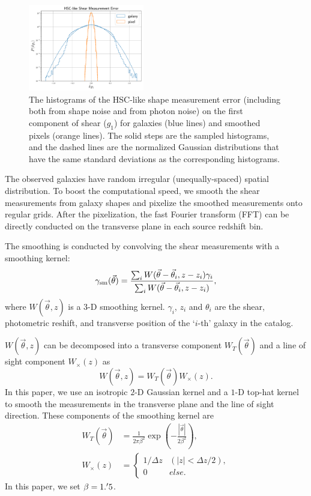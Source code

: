 \documentclass[twocolumn]{aastex62}
\begin{document}
\begin{figure}[!t]
 \centering
 \includegraphics[width=0.45\textwidth]{shapeMeasurementError-HSCY1.pdf}
 \caption{The histograms of the HSC-like shape measurement error (including
         both from shape noise and from photon noise) on the first component of
         shear ($g_1$) for galaxies (blue lines) and smoothed pixels (orange
         lines). The solid steps are the sampled histograms, and the dashed
         lines are the normalized Gaussian distributions that have the same
         standard deviations as the corresponding histograms.
        }
 \label{fig-noiseHistogram}
\end{figure}

The observed galaxies have random irregular (unequally-spaced) spatial
distribution. To boost the computational speed, we smooth the shear
measurements from galaxy shapes and pixelize the smoothed measurements onto
regular grids.  After the pixelization, the fast Fourier transform (FFT) can be
directly conducted on the transverse plane in each source redshift bin.

The smoothing is conducted by convolving the shear measurements with a
smoothing kernel:
\begin{equation}
\gamma_{\rm{sm}} (\vec{\theta})  = \frac{\sum_i
W(\vec{\theta}-\vec{{\theta}}_i,z-z_i) \gamma_i}{\sum_i
W(\vec{\theta}-\vec{{\theta}}_i,z-z_i) },
\end{equation}
where $W(\vec{\theta},z)$ is a $3$-D smoothing kernel. $\gamma_i$, $z_i$ and
$\theta_i$ are the shear, photometric reshift, and transverse position of the
`$i$-th' galaxy in the catalog.

$W(\vec{\theta},z)$ can be decomposed into a transverse component
$W_T(\vec{\theta})$ and a line of sight component
$W_\times(z)$ as
\begin{equation}
W(\vec{\theta},z)=W_T(\vec{\theta}) W_\times (z).
\end{equation}
In this paper, we use an isotropic $2$-D Gaussian kernel and a $1$-D top-hat
kernel to smooth the measurements in the transverse plane and the line of sight
direction. These components of the smoothing kernel are
\begin{equation}
\begin{split}
W_T(\vec{\theta}) &=\frac{1}{2\pi\beta^2}\exp(-\frac{|\vec{\theta}|}{2\beta^2}),\\
W_\times (z) &=
\begin{cases}
1/\Delta z& (|z|<\Delta z/2),\\
0& else.
\end{cases}
\end{split}
\end{equation}
In this paper, we set $\beta=1.\mbox{$^\prime$}5$.
\end{document}
